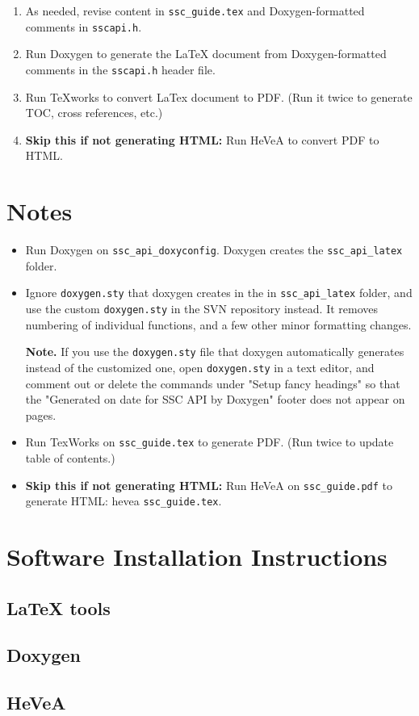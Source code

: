 \documentclass{article}
\begin{document}
\begin{enumerate}

\item As needed, revise content in \texttt{ssc\_guide.tex} and Doxygen-formatted comments in \texttt{sscapi.h}.

\item Run Doxygen to generate the LaTeX document from Doxygen-formatted comments in the \texttt{sscapi.h} header file.

\item Run TeXworks to convert LaTex document to PDF. (Run it twice to generate TOC, cross references, etc.)

\item \textbf{Skip this if not generating HTML:} Run HeVeA to convert PDF to HTML.

\end{enumerate}

\section{Notes}

\begin{itemize}

\item Run Doxygen on \texttt{ssc\_api\_doxyconfig}. Doxygen creates the \texttt{ssc\_api\_latex} folder.

\item Ignore \texttt{doxygen.sty} that doxygen creates in the in \texttt{ssc\_api\_latex} folder, and use the custom \texttt{doxygen.sty} in the SVN repository instead. It removes numbering of individual functions, and a few other minor formatting changes.

\textbf{Note.} If you use the \texttt{doxygen.sty} file that doxygen automatically generates instead of the customized one, open \texttt{doxygen.sty} in a text editor, and comment out or delete the commands under "Setup fancy headings" so that the "Generated on date for SSC API by Doxygen" footer does not appear on pages.

\item Run TexWorks on \texttt{ssc\_guide.tex} to generate PDF. (Run twice to update table of contents.)

\item \textbf{Skip this if not generating HTML:} Run HeVeA on \texttt{ssc\_guide.pdf} to generate HTML: hevea \texttt{ssc\_guide.tex}.

\end{itemize}
\section{Software Installation Instructions}


\subsection{LaTeX tools}

\subsection{Doxygen}

\subsection{HeVeA}
\end{document}
